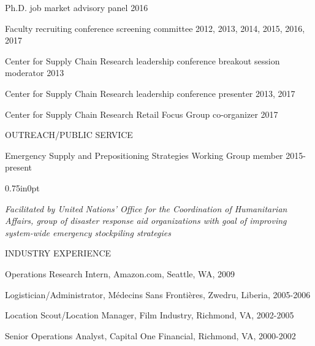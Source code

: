 \documentclass[letterpaper,11pt,oneside]{article}
\newcommand\myIndent{0.75in}
\newcommand\myParSkip{3pt}
\newcommand\myHangIndent{1in}
\newcommand\mySpaceBeforeSection{0.9em}
\newcommand{\NiceIndent}{ \parindent=\myIndent \hangindent=\myHangIndent }
\newenvironment{miniListBullet}
    {
        \begin{adjustwidth}{\myIndent}{0pt}
        \setlength{\parskip}{0pt}%
        \renewcommand\labelitemi{{\boldmath$\cdot$}}
        \begin{itemize}
        \setlength\itemsep{0em}
    }
    {
        \end{itemize}
        \setlength{\parskip}{\myParSkip}%
        \end{adjustwidth}
    }
\begin{document}
\NiceIndent Ph.D. job market advisory panel 2016

\NiceIndent Faculty recruiting conference screening committee 2012, 2013, 2014, 2015, 2016, 2017

\NiceIndent Center for Supply Chain Research leadership conference breakout session moderator 2013

\NiceIndent Center for Supply Chain Research leadership conference presenter 2013, 2017

\NiceIndent Center for Supply Chain Research Retail Focus Group co-organizer 2017

\vspace{\mySpaceBeforeSection}
\noindent OUTREACH/PUBLIC SERVICE

\NiceIndent Emergency Supply and Prepositioning Strategies Working Group member 2015-present
\begin{miniListBullet}
    \textit{Facilitated by United Nations' Office for the Coordination of Humanitarian Affairs, group of disaster response aid organizations with goal of improving system-wide emergency stockpiling strategies}
\end{miniListBullet}

\vspace{\mySpaceBeforeSection}
\noindent INDUSTRY EXPERIENCE

\NiceIndent Operations Research Intern, Amazon.com, Seattle, WA, 2009

\NiceIndent Logistician/Administrator, M\'edecins Sans Fronti\`eres, Zwedru, Liberia, 2005-2006


\NiceIndent Location Scout/Location Manager, Film Industry, Richmond, VA, 2002-2005

\NiceIndent Senior Operations Analyst, Capital One Financial, Richmond, VA, 2000-2002
\end{document}
